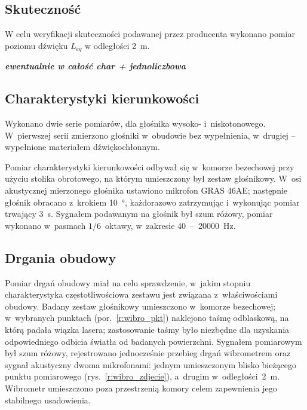 \documentclass[12pt]{oska}
\newcommand{\range}[2]{\num{#1}~--~\num{#2}}
\newcommand{\comment}[1]{{\color{magenta}\emph{\textbf{#1}}}}
\begin{document}
		\subsection{Skuteczność}
		
			W celu weryfikacji skuteczności podawanej przez producenta wykonano pomiar poziomu dźwięku $L_{eq}$ w odległości \SI{2}{\metre}. 
			
		
			\comment{ewentualnie w całość char + jednoliczbowa}
			
		\subsection{Charakterystyki kierunkowości}
			
			Wykonano dwie serie pomiarów, dla głośnika wysoko- i~niskotonowego. W~pierwszej serii zmierzono głośniki w~obudowie bez wypełnienia, w~drugiej -- wypełnione materiałem dźwiękochłonnym.
			
			Pomiar charakterystyki kierunkowości odbywał się w~komorze bezechowej przy użyciu stolika obrotowego, na którym umieszczony był zestaw głośnikowy. W~osi akustycznej mierzonego głośnika ustawiono mikrofon GRAS 46AE; następnie głośnik obracano z~krokiem \SI{10}{\degree}, każdorazowo zatrzymując i~wykonując pomiar trwający \SI{3}{\s}. Sygnałem podawanym na głośnik był szum różowy, pomiar wykonano w~pasmach $1/6$~oktawy, w~zakresie \range{40}{20000}~\si{\hertz}.
			
		\subsection{Drgania obudowy}
			
			Pomiar drgań obudowy miał na celu sprawdzenie, w~jakim stopniu charakterystyka częstotliwościowa zestawu jest związana z~właściwościami obudowy. Badany zestaw głośnikowy umieszczono w~komorze bezechowej; w~wybranych punktach (por.~\ref{r:wibro_pkt}) naklejono taśmę odblaskową, na którą padała wiązka lasera; zastosowanie taśmy było niezbędne dla uzyskania odpowiedniego odbicia światła od badanych powierzchni. %
			Sygnałem pomiarowym był szum różowy, rejestrowano jednocześnie przebieg drgań wibrometrem oraz sygnał akustyczny dwoma mikrofonami: jednym umieszczonym blisko bieżącego punktu pomiarowego (rys.~\ref{r:wibro_zdjecie}), a~drugim w~odległości~\SI{2}{\metre}. Wibrometr umieszczono poza przestrzenią komory celem zapewnienia jego stabilnego usadowienia.
			
\end{document}

